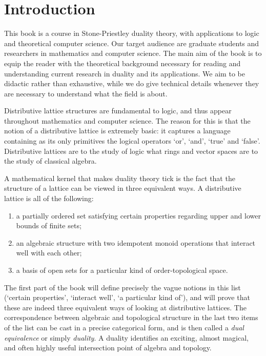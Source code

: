 \chapter*{Introduction}

This book is a course in Stone-Priestley duality theory, with applications to logic and theoretical computer science. Our target audience are graduate students and researchers in mathematics and computer science. The main aim of the book is to equip the reader with the theoretical background necessary for reading and understanding current research in duality and its applications. We aim to be didactic rather than exhaustive, while we do give technical details whenever they are necessary to understand what the field is about.

Distributive lattice structures are fundamental to logic, and thus appear throughout mathematics and computer science. The reason for this is that the notion of a distributive lattice is extremely basic: it captures a language containing as its only primitives the logical operators `or', `and', `true' and `false'. Distributive lattices are to the study of logic what rings and vector spaces are to the study of classical algebra.

A mathematical kernel that makes duality theory tick is the fact that the structure of a lattice can be viewed in three equivalent ways. A distributive lattice is all of the following:
\begin{enumerate}
\item a partially ordered set satisfying certain properties regarding upper and lower bounds of finite sets;
\item an algebraic structure with two idempotent monoid operations that interact well with each other;
\item a basis of open sets for a particular kind of order-topological space.
\end{enumerate}
The first part of the book will define precisely the vague notions in this list (`certain properties', `interact well', `a particular kind of'), and will prove that these are indeed three equivalent ways of looking at distributive lattices. The correspondence between algebraic and topological structure in the last two items of the list can be cast in a precise categorical form, and is then called a \emph{dual equivalence} or simply \emph{duality}. A duality identifies an exciting, almost magical, and often highly useful intersection point of algebra and topology.

